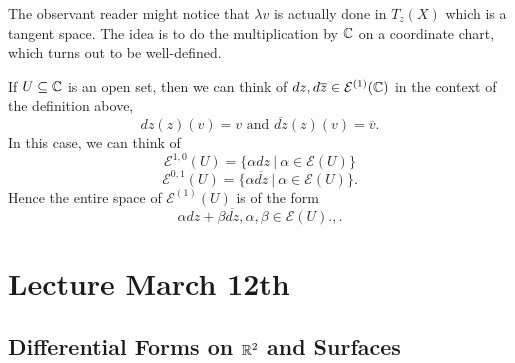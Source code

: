 \documentclass{article}
\begin{document}
{\begin{definition}
     The observant reader might notice that $\lambda v$ is actually done in $T_z(X)$ which is a tangent space. The idea is to do the multiplication by $\mathbb{C}$ on a coordinate chart, which turns out to be well-defined.\\
\end{definition}

\begin{example}
    If $U \subseteq \mathbb{C}$ is an open set, then we can think of $dz, d\overline{z} \in \mathcal{E}^{(1)}(\mathbb{C})$ in the context of the definition above,
\[dz(z)(v) = v \text{ and } \overline{dz}(z)(v) = \overline{v}. \]
In this case, we can think of
\[\mathcal{E}^{1, 0}(U) = \{\alpha dz \ |\ \alpha \in \mathcal{E}(U)\}\]
\[\mathcal{E}^{0, 1}(U) = \{\alpha \overline{dz}\ |\ \alpha \in \mathcal{E}(U)\}.\]
Hence the entire space of $\mathcal{E}^{(1)}(U)$ is of the form
\[\alpha dz + \beta \overline{dz}, \alpha, \beta \in \mathcal{E}(U).,.\]
\end{example}

\newpage
\section{Lecture March 12th}

\subsection{Differential Forms on $\mathbb{R}^2$ and Surfaces}


}
\end{document}
